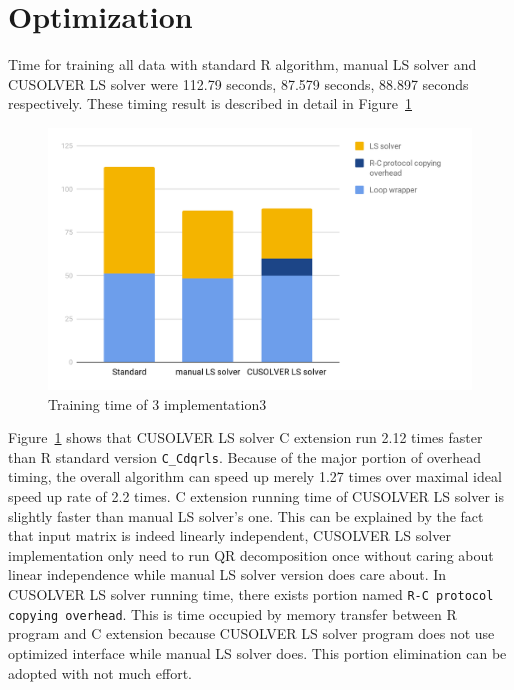\documentclass[English]{dicomopapers}
\begin{document}
\section{Optimization}
Time for training all data with standard R algorithm, manual LS solver and CUSOLVER LS solver were 112.79 seconds, 87.579 seconds, 88.897 seconds respectively. These timing result is described in detail in Figure~\ref{fig:qr_ret}\newline

\begin{figure}[ht]
  \vspace*{-1.5cm}
  \centering
  \includegraphics[width=\columnwidth,natwidth=1200,natheight=742]{qr_ret.png}
  \caption{Training time of 3 implementation3}\label{fig:qr_ret}
\end{figure}
Figure~\ref{fig:qr_ret} shows that CUSOLVER LS solver C extension run 2.12 times faster than R standard version \texttt{C\_Cdqrls}. Because of the major portion of overhead timing, the overall algorithm can speed up merely 1.27 times over maximal ideal speed up rate of 2.2 times. C extension running time of CUSOLVER LS solver is slightly faster than manual LS solver's one. This can be explained by the fact that input matrix is indeed linearly independent, CUSOLVER LS solver implementation only need to run QR decomposition once without caring about linear independence while manual LS solver version does care about. In CUSOLVER LS solver running time, there exists portion named \texttt{R-C protocol copying overhead}. This is time occupied by memory transfer between R program and C extension because CUSOLVER LS solver program does not use optimized interface while manual LS solver does. This portion elimination can be adopted with not much effort.\newline
\end{document}
